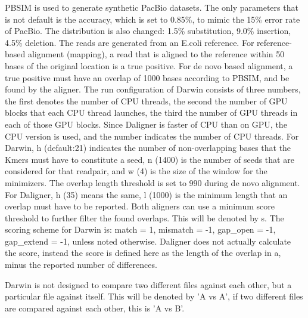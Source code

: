 \documentclass[../main/thesis.tex]{subfiles}
\begin{document}
PBSIM \cite{PBSIM} is used to generate synthetic PacBio datasets.
The only parameters that is not default is the accuracy, which is set to 0.85\%, to mimic the 15\% error rate of PacBio.
The distribution is also changed: 1.5\% substitution, 9.0\% insertion, 4.5\% deletion.
The reads are generated from an E.coli reference.
For reference-based alignment (mapping), a read that is aligned to the reference within 50 bases of the original location is a true positive.
For de novo based alignment, a true positive must have an overlap of 1000 bases according to PBSIM, and be found by the aligner.
The run configuration of Darwin consists of three numbers, the first denotes the number of CPU threads, the second the number of GPU blocks that each CPU thread launches, the third the number of GPU threads in each of those GPU blocks.
Since Daligner is faster of CPU than on GPU, the CPU version is used, and the number indicates the number of CPU threads.
For Darwin, h (default:21) indicates the number of non-overlapping bases that the Kmers must have to constitute a seed, n (1400) is the number of seeds that are considered for that readpair, and w (4) is the size of the window for the minimizers.
The overlap length threshold is set to 990 during de novo alignment.
For Daligner, h (35) means the same, l (1000) is the minimum length that an overlap must have to be reported.
Both aligners can use a minimum score threshold to further filter the found overlaps.
This will be denoted by s.
The scoring scheme for Darwin is: match = 1, mismatch = -1, gap\_open = -1, gap\_extend = -1, unless noted otherwise.
Daligner does not actually calculate the score, instead the score is defined here as the length of the overlap in a, minus the reported number of differences.

Darwin is not designed to compare two different files against each other, but a particular file against itself.
This will be denoted by 'A vs A', if two different files are compared against each other, this is 'A vs B'.




\end{document}
